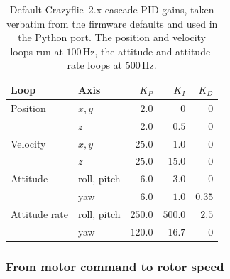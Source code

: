 \documentclass[11pt,a4paper]{article}
\theoremstyle{remark}
\numberwithin{equation}{section}
\begin{document}
\begin{table}[h]
    \centering
    \caption{Default Crazyflie~2.x cascade-PID gains, taken verbatim from the
    firmware defaults and used in the Python port. The
    position and velocity loops run at $100\,\mathrm{Hz}$, the attitude and
    attitude-rate loops at $500\,\mathrm{Hz}$.}
    \label{tab:cf_gains}
    \small
    \begin{tabular}{ll rrr}
        \toprule
        Loop & Axis & $K_P$ & $K_I$ & $K_D$ \\
        \midrule
        Position & $x,y$ & $2.0$ & $0$ & $0$ \\
                 & $z$   & $2.0$ & $0.5$ & $0$ \\
        \midrule
        Velocity & $x,y$ & $25.0$ & $1.0$ & $0$ \\
                 & $z$   & $25.0$ & $15.0$ & $0$ \\
        \midrule
        Attitude & roll, pitch & $6.0$ & $3.0$ & $0$ \\
                 & yaw         & $6.0$ & $1.0$ & $0.35$ \\
        \midrule
        Attitude rate & roll, pitch & $250.0$ & $500.0$ & $2.5$ \\
                      & yaw         & $120.0$ & $16.7$  & $0$ \\
        \bottomrule
    \end{tabular}
\end{table}

\subsubsection*{From motor command to rotor speed}
\end{document}
